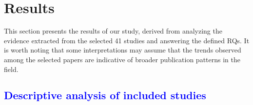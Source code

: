 \section{Results}
\label{sec:results}


This section presents the results of our study, derived from analyzing the evidence extracted from the selected 41 studies and answering the defined RQs. It is worth noting that some interpretations may assume that the trends observed among the selected papers are indicative of broader publication patterns in the field.


\subsection{\textcolor{blue}{Descriptive analysis of included studies}}
